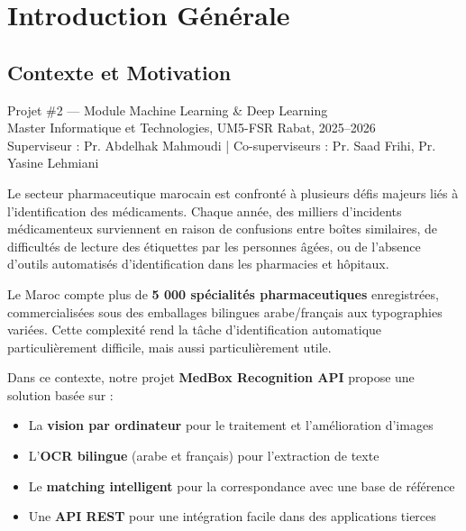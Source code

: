 \documentclass[12pt,a4paper]{report}
\begin{document}
\tableofcontents
\clearpage

\chapter{Introduction G\'en\'erale}

\section{Contexte et Motivation}

\begin{infobox}
Projet \#2 --- Module Machine Learning \& Deep Learning\\
Master Informatique et Technologies, UM5-FSR Rabat, 2025--2026\\
Superviseur : Pr. Abdelhak Mahmoudi | Co-superviseurs : Pr. Saad Frihi, Pr. Yasine Lehmiani
\end{infobox}

Le secteur pharmaceutique marocain est confront\'e \`a plusieurs d\'efis majeurs li\'es \`a l'identification des m\'edicaments. Chaque ann\'ee, des milliers d'incidents m\'edicamenteux surviennent en raison de confusions entre bo\^ites similaires, de difficult\'es de lecture des \'etiquettes par les personnes \^ag\'ees, ou de l'absence d'outils automatis\'es d'identification dans les pharmacies et h\^opitaux.

Le Maroc compte plus de \textbf{5 000 sp\'ecialit\'es pharmaceutiques} enregistr\'ees, commercialis\'ees sous des emballages bilingues arabe/fran\c{c}ais aux typographies vari\'ees. Cette complexit\'e rend la t\^ache d'identification automatique particuli\`erement difficile, mais aussi particuli\`erement utile.

Dans ce contexte, notre projet \textbf{MedBox Recognition API} propose une solution bas\'ee sur :
\begin{itemize}
  \item La \textbf{vision par ordinateur} pour le traitement et l'am\'elioration d'images
  \item L'\textbf{OCR bilingue} (arabe et fran\c{c}ais) pour l'extraction de texte
  \item Le \textbf{matching intelligent} pour la correspondance avec une base de r\'ef\'erence
  \item Une \textbf{API REST} pour une int\'egration facile dans des applications tierces
\end{itemize}
\end{document}
